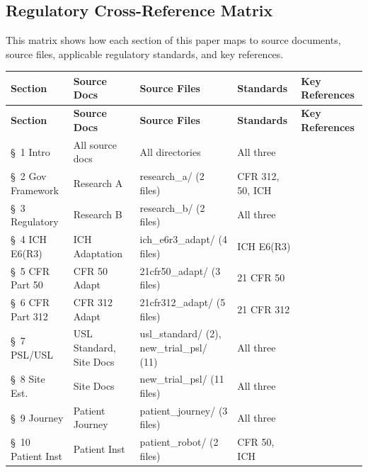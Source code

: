 \newpage

\subsection{Regulatory Cross-Reference Matrix}
\label{app:cross-reference}

This matrix shows how each section of this paper maps to source documents,
source files, applicable regulatory standards, and key references.

\begin{longtable}{p{2.2cm} p{3cm} p{3.2cm} p{2.3cm} p{3.5cm}}
\toprule
\textbf{Section} & \textbf{Source Docs} & \textbf{Source Files} & \textbf{Standards} & \textbf{Key References} \\
\midrule
\endfirsthead
\toprule
\textbf{Section} & \textbf{Source Docs} & \textbf{Source Files} & \textbf{Standards} & \textbf{Key References} \\
\midrule
\endhead
\bottomrule
\endfoot
\S~1 Intro & All source docs & All directories & All three & \cite{tufts-delay, fda-clinical-trials-guidance, nci-clinical-trials} \\
\S~2 Gov Framework & Research A & research\_a/ (2 files) & CFR 312, 50, ICH & \cite{cfr-part-312, cfr-part-50, ich-e6r3, hipaa} \\
\S~3 Regulatory & Research B & research\_b/ (2 files) & All three & \cite{ich-adapt, cfr50-adapt, cfr312-adapt} \\
\S~4 ICH E6(R3) & ICH Adaptation & ich\_e6r3\_adapt/ (4 files) & ICH E6(R3) & \cite{ich-adapt, ich-e6r3, usl-standard} \\
\S~5 CFR Part 50 & CFR 50 Adapt & 21cfr50\_adapt/ (3 files) & 21 CFR 50 & \cite{cfr50-adapt, cfr-part-50} \\
\S~6 CFR Part 312 & CFR 312 Adapt & 21cfr312\_adapt/ (5 files) & 21 CFR 312 & \cite{cfr312-adapt, cfr-part-312} \\
\S~7 PSL/USL & USL Standard, Site Docs & usl\_standard/ (2), new\_trial\_psl/ (11) & All three & \cite{usl-standard, site-docs} \\
\S~8 Site Est. & Site Docs & new\_trial\_psl/ (11 files) & All three & \cite{site-docs, ich-adapt, cfr50-adapt} \\
\S~9 Journey & Patient Journey & patient\_journey/ (3 files) & All three & \cite{patient-journey-paper, usl-standard} \\
\S~10 Patient Inst & Patient Inst & patient\_robot/ (2 files) & CFR 50, ICH & \cite{patient-instructions-paper, cfr50-adapt} \\

\end{longtable}

